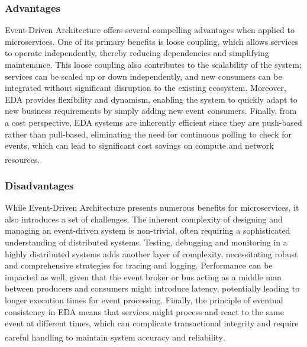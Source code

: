 \subsubsection{Advantages}
Event-Driven Architecture offers several compelling advantages when applied to microservices. One of
its primary benefits is loose coupling, which allows services to operate independently, thereby
reducing dependencies and simplifying maintenance. This loose coupling also contributes to the
scalability of the system; services can be scaled up or down independently, and new consumers can be
integrated without significant disruption to the existing ecosystem. Moreover, EDA provides
flexibility and dynamism, enabling the system to quickly adapt to new business requirements by
simply adding new event consumers. Finally, from a cost perspective, EDA systems are inherently
efficient since they are push-based rather than pull-based, eliminating the need for continuous
polling to check for events, which can lead to significant cost savings on compute and network
resources\textsuperscript{\cite{event_6}}\textsuperscript{\cite{event_2}}.

\subsubsection{Disadvantages}
While Event-Driven Architecture presents numerous benefits for microservices, it also introduces a
set of challenges. The inherent complexity of designing and managing an event-driven system is
non-trivial, often requiring a sophisticated understanding of distributed systems. Testing,
debugging and monitoring in a highly distributed systems adds another layer of complexity,
necessitating robust and comprehensive strategies for tracing and logging. Performance can be
impacted as well, given that the event broker or bus acting as a middle man between producers and
consumers might introduce latency, potentially leading to longer execution times for event
processing. Finally, the principle of eventual consistency in EDA means that services might process
and react to the same event at different times, which can complicate transactional integrity and
require careful handling to maintain system accuracy and
reliability\textsuperscript{\cite{event_6}}\textsuperscript{\cite{event_3}}.

